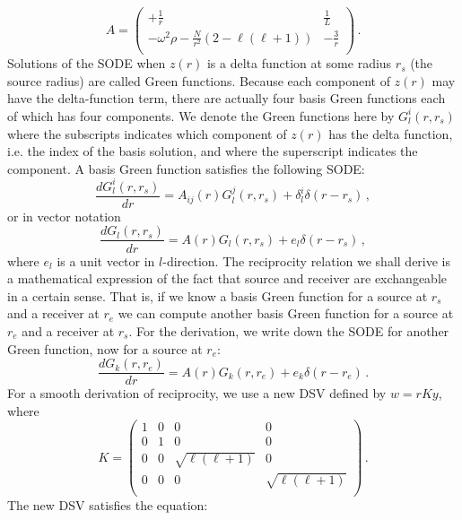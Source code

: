 \documentclass[11pt,a4paper]{article}
\begin{document}
%
\begin{equation}
A = \left(\begin{array}{cccc}
+\frac{1}{r} & \frac{1}{L} \\
-\omega^2\rho-\frac{N}{r^2}(2-\ell(\ell+1)) & -\frac{3}{r} \\
\end{array}\right) \,.
\end{equation}
%
Solutions of the SODE when $z(r)$ is a delta function at some radius $r_s$ (the source radius) are called Green functions. Because each component of $z(r)$ may have the delta-function term, there are actually four basis Green functions each of which has four components. We denote the Green functions here by $G_l^i(r,r_s)$ where the subscripts indicates which component of $z(r)$ has the delta function, i.e. the index of the basis solution, and where the superscript indicates the component. A basis Green function satisfies the following SODE:
%
\begin{equation}
\frac{dG_l^i(r,r_s)}{dr}=A_{ij}(r)G_l^j(r,r_s)+\delta_l^i\delta(r-r_s) \,,
\end{equation}
or in vector notation
\begin{equation}
\frac{dG_l(r,r_s)}{dr}=A(r)G_l(r,r_s)+e_l\delta(r-r_s) \,,
\end{equation}
%
where $e_l$ is a unit vector in $l$-direction.
%
The reciprocity relation we shall derive is a mathematical expression of the fact that source and receiver are exchangeable in a certain sense. That is, if we know a basis Green function for a source at $r_s$ and a receiver at $r_e$ we can compute another basis Green function for a source at $r_e$ and a receiver at $r_s$. For the derivation, we write down the SODE for another Green function, now for a source at $r_e$:
%
\begin{equation}
\frac{dG_k(r,r_e)}{dr}=A(r)G_k(r,r_e)+e_k\delta(r-r_e) \,.
\end{equation}
%
For a smooth derivation of reciprocity, we use a new DSV defined by $w=rKy$, where 
%
\begin{equation}
K = \left(\begin{array}{cccc}
1 & 0 & 0 & 0 \\
0 & 1 & 0 & 0 \\
0 & 0 & \sqrt{\ell(\ell+1)} & 0 \\
0 & 0 & 0 & \sqrt{\ell(\ell+1)} \\
\end{array}\right) \,.
\end{equation}
%
The new DSV satisfies the equation:
\end{document}
